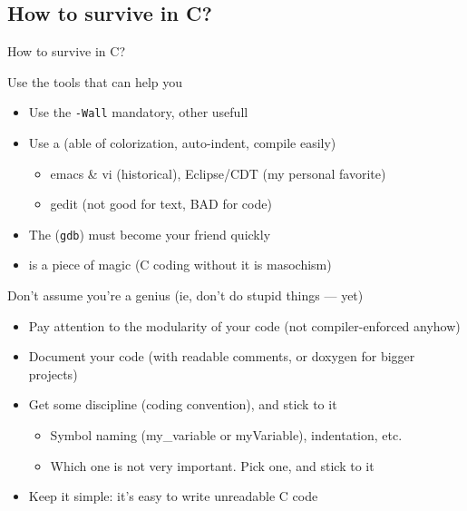 \subsection{How to survive in C?}
\begin{frame}{How to survive in C?}
  \begin{block}{Use the tools that can help you}
    \begin{itemize}
    \item Use the  \texttt{-Wall} mandatory,
      other usefull
    \item Use a  (able of colorization, auto-indent,
      compile easily)
      \begin{itemize}
      \item {} emacs \& vi (historical),
        Eclipse{\small/CDT} (my personal favorite)
      \item {} gedit (not good for text, BAD for code)
      \end{itemize}
    \item The  (\texttt{gdb}) must become your friend
      quickly
    \item {} is a piece of magic (C coding without it is
      masochism)
    \end{itemize}
  \end{block}

  \begin{block}{Don't assume you're a genius (ie, don't do stupid things ---
      yet)}
    \begin{itemize}
    \item Pay attention to the modularity of your code (not compiler-enforced anyhow)
    \item Document your code (with readable comments, or doxygen for bigger
      projects) 
    \item Get some discipline (coding convention), and stick to it
      \begin{itemize}
      \item Symbol naming (my\_variable or myVariable), indentation, etc.
      \item Which one is not very important. Pick one, and stick to it
      \end{itemize}
    \item Keep it simple: it's easy to write unreadable C code
    \end{itemize}
  \end{block}
\end{frame}
